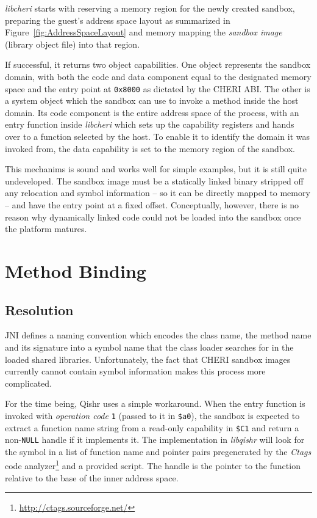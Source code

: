 \documentclass[a4paper,12pt,twoside,openright]{report}
\newcommand{\reg}[1]{\texttt{\$#1}}
\newcommand{\tool}[1]{\emph{#1}}
\newcommand{\lib}[1]{\tool{lib#1}}
\begin{document}
\lib{cheri} starts with reserving a memory region for the newly created sandbox, preparing the guest's address space layout as summarized in Figure~\ref{fig:AddressSpaceLayout} and memory mapping the \emph{sandbox image} (library object file) into that region. \label{sec:AddressSpaceLayout}

If successful, it returns two object capabilities. One object represents the sandbox domain, with both the code and data component equal to the designated memory space and the entry point at \texttt{0x8000} as dictated by the CHERI ABI. \label{sec:SystemObject} The other is a system object which the sandbox can use to invoke a method inside the host domain. Its code component is the entire address space of the process, with an entry function inside \lib{cheri} which sets up the capability registers and hands over to a function selected by the host. To enable it to identify the domain it was invoked from, the data capability is set to the memory region of the sandbox. 

This mechanims is sound and works well for simple examples, but it is still quite undeveloped. The sandbox image must be a statically linked binary stripped off any relocation and symbol information -- so it can be directly mapped to memory -- and have the entry point at a fixed offset. Conceptually, however, there is no reason why dynamically linked code could not be loaded into the sandbox once the platform matures.

\section{Method Binding}

\subsection{Resolution}

JNI defines a naming convention which encodes the class name, the method name and its signature into a symbol name that the class loader searches for in the loaded shared libraries. Unfortunately, the fact that CHERI sandbox images currently cannot contain symbol information makes this process more complicated.

For the time being, Qishr uses a simple workaround. When the entry function is invoked with \emph{operation code} \texttt{1} (passed to it in \reg{a0}), the sandbox is expected to extract a function name string from a read-only capability in \reg{C1} and return a non-\texttt{NULL} handle if it implements it. The implementation in \lib{qishr} will look for the symbol in a list of function name and pointer pairs pregenerated by the \tool{Ctags} code analyzer\footnote{\url{http://ctags.sourceforge.net/}} and a provided script. The handle is the pointer to the function relative to the base of the inner address space.
\end{document}

